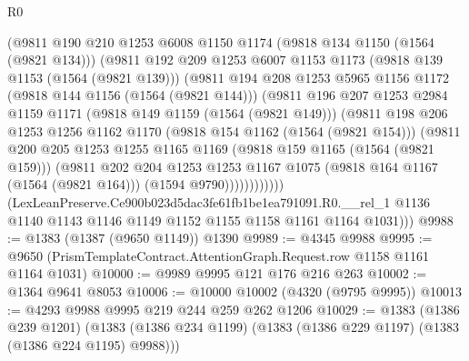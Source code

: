 \begin{lexlean}{R0}
\begin{coremodule}
                (@9811
                  @190
                  @210
                  @1253
                  @6008
                  @1150
                  @1174
                  (@9818 @134 @1150 (@1564 (@9821 @134)))
                  (@9811
                    @192
                    @209
                    @1253
                    @6007
                    @1153
                    @1173
                    (@9818 @139 @1153 (@1564 (@9821 @139)))
                    (@9811
                      @194
                      @208
                      @1253
                      @5965
                      @1156
                      @1172
                      (@9818 @144 @1156 (@1564 (@9821 @144)))
                      (@9811
                        @196
                        @207
                        @1253
                        @2984
                        @1159
                        @1171
                        (@9818 @149 @1159 (@1564 (@9821 @149)))
                        (@9811
                          @198
                          @206
                          @1253
                          @1256
                          @1162
                          @1170
                          (@9818 @154 @1162 (@1564 (@9821 @154)))
                          (@9811
                            @200
                            @205
                            @1253
                            @1255
                            @1165
                            @1169
                            (@9818 @159 @1165 (@1564 (@9821 @159)))
                            (@9811
                              @202
                              @204
                              @1253
                              @1253
                              @1167
                              @1075
                              (@9818 @164 @1167 (@1564 (@9821 @164)))
                              (@1594 @9790))))))))))))
        (LexLeanPreserve.Ce900b023d5dac3fe61fb1be1ea791091.R0.__rel_1
          @1136
          @1140
          @1143
          @1146
          @1149
          @1152
          @1155
          @1158
          @1161
          @1164
          @1031)))
@9988 := @1383 (@1387 (@9650 @1149)) @1390
@9989 := @4345 @9988
@9995 := @9650 (PrismTemplateContract.AttentionGraph.Request.row @1158 @1161 @1164 @1031)
@10000 := @9989 @9995 @121 @176 @216 @263
@10002 := @1364 @9641 @8053
@10006 := @10000 @10002 (@4320 (@9795 @9995))
@10013 := @4293 @9988 @9995 @219 @244 @259 @262 @1206
@10029 := @1383
    (@1386 @239 @1201)
    (@1383 (@1386 @234 @1199) (@1383 (@1386 @229 @1197) (@1383 (@1386 @224 @1195) @9988)))

\end{coremodule}
\end{lexlean}
